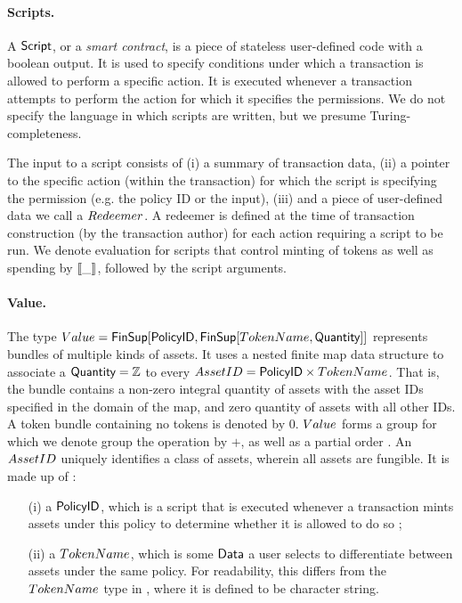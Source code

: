 \paragraph{Scripts. } A $\textsf{Script}$, or a \emph{smart contract},
is a piece of stateless user-defined code with a
boolean output. It is used to specify conditions under which a transaction is allowed
to perform a specific action. It is executed
whenever a transaction attempts to perform the action for which it specifies the
permissions. We do not specify the language in which scripts are written,
but we presume Turing-completeness.

The input to a script consists of (i) a summary of transaction data,
(ii) a pointer to the specific action (within the transaction) for which the script
is specifying the permission (e.g. the policy ID or the input),
(iii) and a piece of user-defined data we call a $\Redeemer$. A redeemer is defined
at the time of transaction construction (by the transaction author) for each action
requiring a script to be
run. We denote evaluation for scripts that control
minting of tokens as well as spending by $\llbracket\_\rrbracket$, followed by the
script arguments.

\paragraph{Value. } The type $\Value = \FinSup{\Policy}{\FinSup{\TokenName}{\Quantity}}$
represents bundles of multiple kinds of assets.
It uses a nested finite map data structure to associate a $\textsf{Quantity} = \mathbb{Z}$
to every $\AssetID = \Policy \times \TokenName$. That is, the bundle contains a
non-zero integral quantity of assets with the asset IDs specified
in the domain of the map, and zero quantity of assets with all other IDs.
A token bundle containing no tokens is denoted by $0$. $\Value$ forms a group for
which we denote group the operation by $+$, as well as a partial order \cite{utxoma}.
An $\AssetID$
uniquely identifies a class of assets, wherein all assets are fungible. It is made up of :

\begin{itemize}
  \item[(i)] a $\textsf{PolicyID}$, which is a script that is executed
  whenever a transaction
  mints assets under this policy to determine whether it is allowed to do so ;
  \item[(ii)] a $\TokenName$, which is some $\textsf{Data}$ a user selects to differentiate between
  assets under the same policy. For readability, this differs from the $\TokenName$ type in \cite{eutxoma},
  where it is defined to be character string.
\end{itemize}

